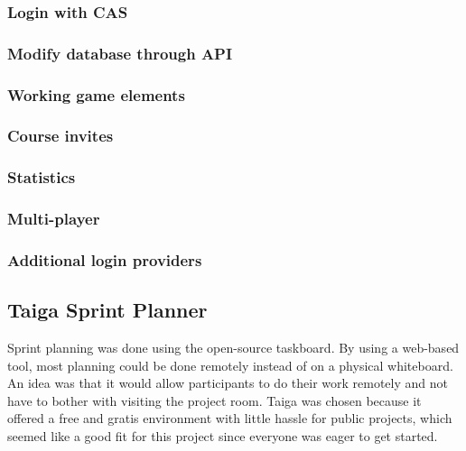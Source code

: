 \subsubsection{Login with CAS}
\subsubsection{Modify database through API}
\subsubsection{Working game elements}
\subsubsection{Course invites}
\subsubsection{Statistics}
\subsubsection{Multi-player}
\subsubsection{Additional login providers}

\subsection{Taiga Sprint Planner}
Sprint planning was done using the open-source \taiga{} taskboard. By using a web-based tool, most planning could be done remotely instead of on a physical whiteboard. An idea was that it would allow participants to do their work remotely and not have to bother with visiting the project room. Taiga was chosen because it offered a free and gratis environment with little hassle for public projects, which seemed like a good fit for this project since everyone was eager to get started.

